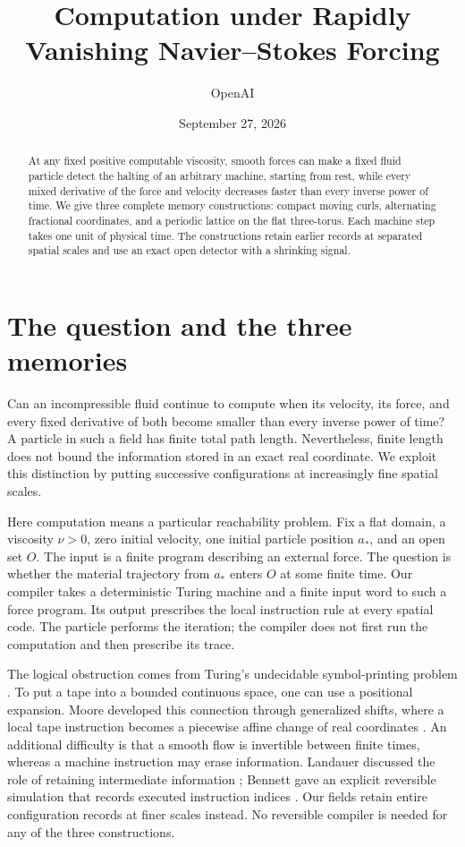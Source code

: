 \documentclass[11pt]{article}
\title{Computation under Rapidly Vanishing Navier--Stokes Forcing}
\author{OpenAI}
\date{September 27, 2026}
\theoremstyle{remark}
\begin{document}
\maketitle
\begin{abstract}
At any fixed positive computable viscosity, smooth forces can make a fixed
fluid particle detect the halting of an arbitrary machine, starting from
rest, while every mixed derivative of the force and velocity decreases
faster than every inverse power of time. We give three complete memory
constructions: compact moving curls, alternating fractional coordinates,
and a periodic lattice on the flat three-torus. Each machine step takes
one unit of physical time. The constructions retain earlier records at
separated spatial scales and use an exact open detector with a shrinking
signal.
\end{abstract}

\section{The question and the three memories}\label{sec:introduction}

Can an incompressible fluid continue to compute when its velocity, its
force, and every fixed derivative of both become smaller than every
inverse power of time? A particle in such a field has finite total path
length. Nevertheless, finite length does not bound the information
stored in an exact real coordinate. We exploit this distinction by
putting successive configurations at increasingly fine spatial scales.

Here computation means a particular reachability problem. Fix a flat
domain, a viscosity $\nu>0$, zero initial velocity, one initial particle
position $a_*$, and an open set $O$. The input is a finite program
describing an external force. The question is whether the material
trajectory from $a_*$ enters $O$ at some finite time. Our compiler takes
a deterministic Turing machine and a finite input word to such a force
program. Its output prescribes the local instruction rule at every
spatial code. The particle performs the iteration; the compiler does
not first run the computation and then prescribe its trace.

The logical obstruction comes from Turing's undecidable symbol-printing
problem \cite[Section~8]{Turing}. To put a tape into a bounded continuous
space, one can use a positional expansion. Moore developed this connection
through generalized shifts, where a local tape instruction becomes a
piecewise affine change of real coordinates \cite{Moore1990,Moore}.
An additional difficulty is that a smooth flow is invertible between
finite times, whereas a machine instruction may erase information.
Landauer discussed the role of retaining intermediate information
\cite[Section~3]{Landauer}; Bennett gave an explicit reversible
simulation that records executed instruction indices \cite{Bennett}.
Our fields retain entire configuration records at finer scales instead.
No reversible compiler is needed for any of the three constructions.
\end{document}
